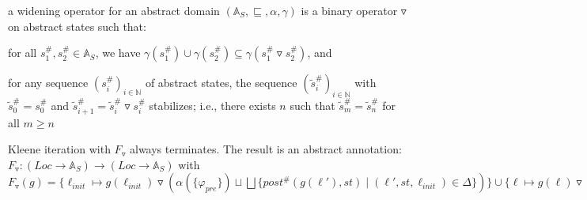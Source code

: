 \documentclass[a4paper]{article}
\begin{document}
\begin{minipage}[t]{0.16\linewidth}
\begin{betterlist}
{{\begin{betterlist}
\begin{betterlist}
						\item a \alert{widening operator} for an abstract domain $(\mathbb{A}_S, \sqsubseteq, \alpha, \gamma)$ is a binary operator $\triangledown$ on abstract states such that:
						\begin{betterlist}
							\item for all $s^\#_1, s^\#_2 \in \mathbb{A}_S$, we have $\gamma(s^\#_1) \cup \gamma(s^\#_2) \subseteq \gamma(s^\#_1 \triangledown s^\#_2)$, and
							\item for any sequence $(s^\#_i)_{i\in \mathbb{N}}$ of abstract states, the sequence $(\tilde s^\#_i)_{i\in \mathbb{N}}$ with $\tilde s^\#_0 = s^\#_0$ and $\tilde s^\#_{i+1} = \tilde s^\#_i \triangledown s^\#_i$ stabilizes; i.e., there exists $n$ such that $\tilde s^\#_m = \tilde s^\#_n$ for all $m \ge n$
						\end{betterlist}
						\item Kleene iteration with $F_{\triangledown}$ always terminates. The result is an abstract annotation: $F_{\triangledown}: (Loc \rightarrow \mathbb{A}_S) \rightarrow (Loc \rightarrow \mathbb{A}_S)$ with $F_{\triangledown}(g) = \{\ell_{init} \mapsto g(\ell_{init}) \triangledown(\alpha(\{\varphi_{pre}\}) \sqcup \bigsqcup \{post^\#(g(\ell'), st) \mid (\ell', st, \ell_{init}) \in \Delta\})\}\cup \{\ell\mapsto g(\ell) \triangledown \bigsqcup\{post^\#(g(\ell'), st) \mid (\ell', st, \ell) \in \Delta\} \mid \ell \in Loc \setminus \{\ell_{init}\}\}$
					\end{betterlist}

\end{betterlist}}}
\end{betterlist}
\end{minipage}
\end{document}

